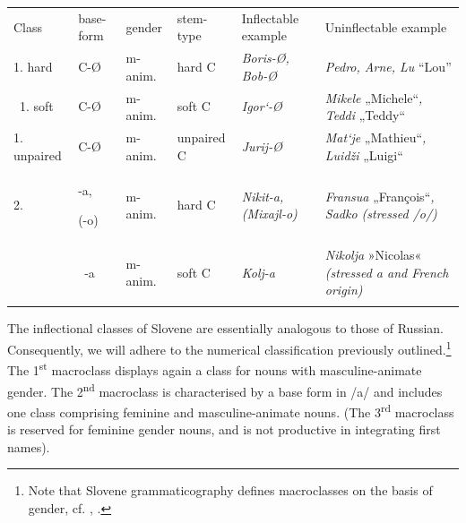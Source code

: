 \documentclass[output=paper]{langscibook}
\begin{document}
\begin{tabularx}{\textwidth}{XXXXXX}

\lsptoprule

Class & base-form & gender & stem-type & Inflectable example & Uninflectable example\\
1. hard & C-Ø & m-anim. & hard C & \textit{Boris-Ø, Bob-Ø} & \textit{Pedro, Arne, Lu} “Lou”\\
~1. soft & C-Ø & m-anim. & soft C & \textit{Igor‘-Ø} & \textit{Mikele} „Michele“\textit{, Teddi} „Teddy“\\
1. unpaired\footnotemark{} & C-Ø & m-anim. & unpaired C & \textit{Jurij-Ø} & \textit{Mat‘je} „Mathieu“\textit{, Luidži} „Luigi“\\
2. & {}-a, 

(-o) & m-anim. & hard C & \textit{Nikit-a, (Mixajl-o)} & \textit{Fransua} „François“\textit{, Sadko (stressed /o/)}\\
~ & ~{}-a & m-anim. & soft C & \textit{Kolj-a} & \textit{Nikolja} »Nicolas« \textit{(stressed a and French origin)}\\
\lspbottomrule
\end{tabularx}
\begin{table}
\caption{Constitutive features of Russian masculine inflectional classes}
\label{tab:key:9}
\end{table}

The inflectional classes of Slovene are essentially analogous to those of Russian. Consequently, we will adhere to the numerical classification previously outlined.\footnote{ \textrm{Note that Slovene grammaticography defines macroclasses on the basis of gender, cf. \citet[40-61]{Herrity2000}, \citet[28-31]{Greenberg2008}.}} The 1\textsuperscript{st} macroclass displays again a class for nouns with masculine-animate gender. The 2\textsuperscript{nd} macroclass is characterised by a base form in /a/ and includes one class comprising feminine and masculine-animate nouns. (The 3\textsuperscript{rd} macroclass is reserved for feminine gender nouns, and is not productive in integrating first names).
\end{document}
